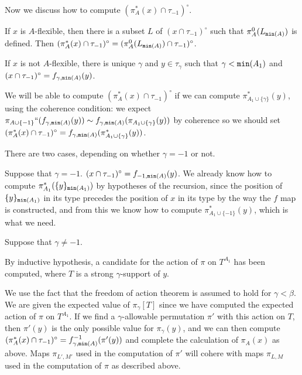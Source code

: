 \documentclass[112pt]{article}
\begin{document}
\begin{description}
Now we discuss how to compute $(\pi^*_A(x)\cap \tau_{-1})^{\circ}$.

If $x$ is $A$-flexible, then there is a subset $L$ of $(x \cap \tau_{-1})^\circ$ such that $\pi^0_A(L_{{\tt min}(A)})$ is defined.  Then $(\pi^*_A(x) \cap \tau_{-1})^\circ = (\pi^0_A(L_{{\tt min}(A)})\cap \tau_{-1})^\circ$.

If $x$ is not $A$-flexible, there is unique $\gamma$ and $y \in \tau_\gamma$ such that $\gamma < {\tt min}(A_1)$ and $(x \cap \tau_{-1})^\circ = f_{\gamma,{\tt min}(A)}(y)$.

We will be able to compute $(\pi^*_A(x) \cap \tau_{-1})^\circ$ if we can compute $\pi^*_{A_1 \cup \{\gamma\}}(y)$, using the coherence condition: we expect
$\pi_{A\cup \{-1\}}``(f_{\gamma,{\tt min}(A)}(y)) \sim f_{\gamma,{\tt min}(A)}(\pi_{A_1 \cup \{\gamma\}}(y))$ by coherence so we should set $(\pi^*_A(x)\cap \tau_{-1})^{\circ} = f_{\gamma,{\tt min}(A)}(\pi^*_{A_1 \cup \{\gamma\}}(y))$.

There are two cases, depending on whether $\gamma=-1$ or not.

Suppose that $\gamma=-1$.   $(x \cap \tau_{-1})^\circ = f_{-1,{\tt min}(A)}(y)$.  We already know how to compute
$\pi^*_{A_1}(\{y\}_{{\tt min}(A_1)})$ by hypotheses of the recursion, since the position of $\{y\}_{{\tt min}(A_1)}$ in its type precedes the position of $x$ in its type by the way the $f$ map is constructed, and from this we know how to compute $\pi^*_{A_1 \cup \{-1\}}(y)$, which is what we need.

Suppose that $\gamma\neq -1$.

By inductive hypothesis, a candidate for the action of $\pi$ on $T^{A_1}$ has been computed, where $T$ is a strong $\gamma$-support of $y$.

We use the fact that the freedom of action theorem is assumed to hold for $\gamma<\beta$.  We are given the expected value of $\pi_\gamma[T]$ since we have computed the expected action
of $\pi$ on $T^{A_1}$.  If we find a $\gamma$-allowable permutation $\pi'$ with this action on $T$, then $\pi'(y)$ is the only possible value for
$\pi_\gamma(y)$, and we can then compute $(\pi^*_A(x)\cap \tau_{-1})^\circ=f_{\gamma,{\tt min}(A)}^{-1}(\pi'(y))$ and complete the calculation of $\pi_A(x)$ as above.  Maps $\pi_{L',M'}$ used in the computation of $\pi'$ will cohere with maps $\pi_{L,M}$ used in the computation of $\pi$ as described above.


\end{description}
\end{document}
